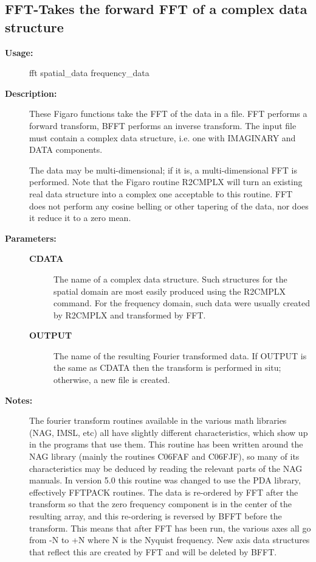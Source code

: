 \subsection{FFT-\label{FFT}Takes the forward FFT of a complex data structure}
\begin{description}

\item [{\bf Usage:}]
 fft spatial_data frequency_data

\item [{\bf Description:}]
 These Figaro functions take the FFT of the data in a file.
 FFT performs a forward transform, BFFT performs an inverse
 transform.  The input file must contain a complex data
 structure, i.e. one with IMAGINARY and DATA components.

 The data may be multi-dimensional; if it is, a multi-dimensional
 FFT is performed.  Note that the Figaro routine R2CMPLX will turn
 an existing real data structure into a complex one acceptable to
 this routine. FFT does not perform any cosine belling or other
 tapering of the data, nor does it reduce it to a zero mean.

\item [{\bf Parameters:}]
\begin{description}
\item [{\bf CDATA}]
 The name of a complex data structure. Such structures
 for the spatial domain are most easily produced using the
 R2CMPLX command. For the frequency domain, such data were
 usually created by R2CMPLX and transformed by FFT.
\item [{\bf OUTPUT}]
 The name of the resulting Fourier transformed data.
 If OUTPUT is the same as CDATA then the transform is
 performed in situ; otherwise, a new file is created.
\end{description}

\item [{\bf Notes:}]
 The fourier transform routines available in the various math
 libraries (NAG, IMSL, etc) all have slightly different
 characteristics, which show up in the programs that use them.
 This routine has been written around the NAG library (mainly
 the routines C06FAF and C06FJF), so many of its characteristics
 may be deduced by reading the relevant parts of the NAG manuals.
 In version 5.0 this routine was changed to use the PDA library,
 effectively FFTPACK routines. The data is re-ordered by FFT after
 the transform so that the zero frequency component is in the
 center of the resulting array, and this re-ordering is reversed by
 BFFT before the transform. This means that after FFT has been run,
 the various axes all go from -N to +N where N is the Nyquist
 frequency.  New axis data structures that reflect this are created
 by FFT and will be deleted by BFFT.


\end{description}
